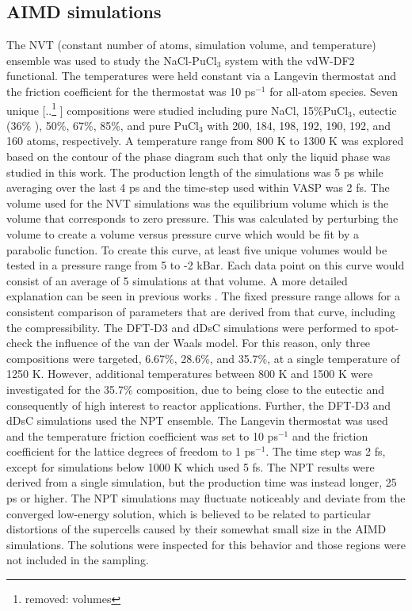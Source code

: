 \documentclass[review]{elsarticle}
\providecommand{\DIFaddtex}[1]{{\protect\color{blue} \sf #1}} %
\providecommand{\DIFdeltex}[1]{{\protect\color{red} [..\footnote{removed: #1} ]}} %
\providecommand{\DIFaddbegin}{} %
\providecommand{\DIFaddend}{} %
\providecommand{\DIFdelbegin}{} %
\providecommand{\DIFdelend}{} %
\providecommand{\DIFadd}[1]{\texorpdfstring{\DIFaddtex{#1}}{#1}} %
\providecommand{\DIFdel}[1]{\texorpdfstring{\DIFdeltex{#1}}{}} %
\newcommand{\DIFscaledelfig}{0.5}
\newlength{\DIFdelgraphicswidth} %
\newlength{\DIFdelgraphicsheight} %
\newcommand{\DIFaddincludegraphics}[2][]{{\color{blue}\fbox{\DIFOincludegraphics[#1]{#2}}}} %
\newcommand{\DIFdelincludegraphics}[2][]{%
\sbox{\DIFdelgraphicsbox}{\DIFOincludegraphics[#1]{#2}}%
\settoboxwidth{\DIFdelgraphicswidth}{\DIFdelgraphicsbox} %
\settoboxtotalheight{\DIFdelgraphicsheight}{\DIFdelgraphicsbox} %
\scalebox{\DIFscaledelfig}{%
\parbox[b]{\DIFdelgraphicswidth}{\usebox{\DIFdelgraphicsbox}\\[-\baselineskip] \rule{\DIFdelgraphicswidth}{0em}}\llap{\resizebox{\DIFdelgraphicswidth}{\DIFdelgraphicsheight}{%
\setlength{\unitlength}{\DIFdelgraphicswidth}%
\begin{picture}(1,1)%
\thicklines\linethickness{2pt} %
{\color[rgb]{1,0,0}\put(0,0){\framebox(1,1){}}}%
{\color[rgb]{1,0,0}\put(0,0){\line( 1,1){1}}}%
{\color[rgb]{1,0,0}\put(0,1){\line(1,-1){1}}}%
\end{picture}%
}\hspace*{3pt}}} %
} %
\DeclareRobustCommand{\DIFaddbegin}{\DIFOaddbegin \let\includegraphics\DIFaddincludegraphics} %
\DeclareRobustCommand{\DIFaddend}{\DIFOaddend \let\includegraphics\DIFOincludegraphics} %
\DeclareRobustCommand{\DIFdelbegin}{\DIFOdelbegin \let\includegraphics\DIFdelincludegraphics} %
\DeclareRobustCommand{\DIFdelend}{\DIFOaddend \let\includegraphics\DIFOincludegraphics} %
\begin{document}
\subsection{AIMD simulations}
The NVT (constant number of atoms, simulation volume, and temperature) ensemble was used to study the NaCl-PuCl$_3$ system with the vdW-DF2 functional. The temperatures were held constant via a Langevin thermostat and the friction coefficient for the thermostat was 10 ps$^{-1}$ for all-atom species. Seven unique \DIFdelbegin \DIFdel{volumes }\DIFdelend \DIFaddbegin \DIFadd{compositions }\DIFaddend were studied including pure NaCl, 15\%PuCl$_3$, eutectic (36\% \cite{bjorklund1959phase, karlsson2022synthesis}), 50\%, 67\%, 85\%, and pure PuCl$_3$ \DIFaddbegin \DIFadd{with 200, 184, 198, 192, 190, 192, and 160 atoms, respectively}\DIFaddend . A temperature range from 800 K to 1300 K was explored based on the contour of the phase diagram such that only the liquid phase was studied in this work. The production length of the simulations was 5 ps while averaging over the last 4 ps and the time-step used within VASP was 2 fs. The volume used for the NVT simulations was the equilibrium volume which is the volume that corresponds to zero pressure. This was calculated by perturbing the volume to create a volume versus pressure curve which would be fit by a parabolic function. To create this curve, at least five unique volumes would be tested in a pressure range from 5 to -2 kBar. Each data point on this curve would consist of an average of 5 simulations at that volume. A more detailed explanation can be seen in previous works \cite{duemmler_liclkcl, duemmler_naclmgcl}. The fixed pressure range allows for a consistent comparison of parameters that are derived from that curve, including the compressibility.
The DFT-D3 and dDsC simulations were performed to spot-check the influence of the van der Waals model. For this reason, only three compositions were targeted, 6.67\%, 28.6\%, and 35.7\%, at a single temperature of 1250 K. However, additional temperatures between 800 K and 1500 K were investigated for the 35.7\% composition, due to being close to the eutectic and consequently of high interest to reactor applications. Further, the DFT-D3 and dDsC simulations used the NPT ensemble. The Langevin thermostat was used and the temperature friction coefficient was set to 10 ps$^{-1}$ and the friction coefficient for the lattice degrees of freedom to 1 ps$^{-1}$. The time step was 2 fs, except for simulations below 1000 K which used 5 fs. The NPT results were derived from a single simulation, but the production time was instead longer, 25 ps or higher. The NPT simulations may fluctuate noticeably and deviate from the converged low-energy solution, which is believed to be related to particular distortions of the supercells caused by their somewhat small size in the AIMD simulations. The solutions were inspected for this behavior and those regions were not included in the sampling. 
\end{document}
